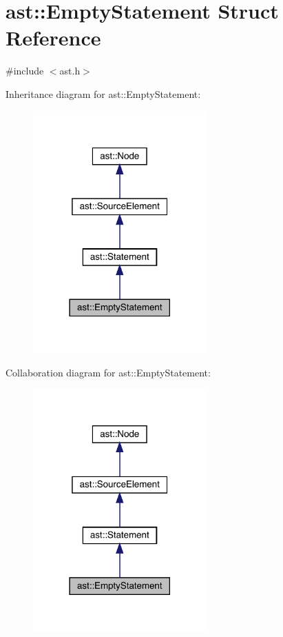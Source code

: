 \hypertarget{structast_1_1_empty_statement}{}\section{ast\+:\+:Empty\+Statement Struct Reference}
\label{structast_1_1_empty_statement}


{\ttfamily \#include $<$ast.\+h$>$}



Inheritance diagram for ast\+:\+:Empty\+Statement\+:
\nopagebreak
\begin{figure}[H]
\begin{center}
\leavevmode
\includegraphics[width=189pt]{structast_1_1_empty_statement__inherit__graph}
\end{center}
\end{figure}


Collaboration diagram for ast\+:\+:Empty\+Statement\+:
\nopagebreak
\begin{figure}[H]
\begin{center}
\leavevmode
\includegraphics[width=189pt]{structast_1_1_empty_statement__coll__graph}
\end{center}
\end{figure}
